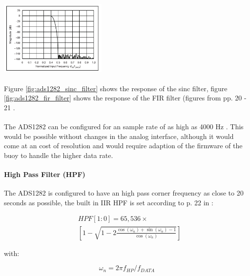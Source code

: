 \documentclass[a4paper]{article}
\begin{document}
\begin{multicols}{2}
\begin{center}
  \includegraphics[width=200px]{ads1282/fir_filter.png}
\end{center}
\label{fig:ads1282_fir_filter}

\paragraph{}
Figure \ref{fig:ads1282_sinc_filter} shows the response of the sinc
filter, figure \ref{fig:ads1282_fir_filter} shows the response of the
FIR filter (figures from  pp. 20 - 21
\cite{ads1282_ds}.

\paragraph{}The
ADS1282 can be configured for an sample rate of as high as 4000 Hz
\cite{ads1282_ds}. This would be possible without changes in the analog
interface, although it would come at an cost of resolution and would
require adaption of the firmware of the buoy to handle the higher data
rate.

\paragraph{High Pass Filter (HPF)} The ADS1282 is configured to have an high
pass corner frequency as close to 20 seconds as possible, the built in
IIR HPF is set according to p. 22 in :

\begin{equation}
  \begin{aligned}
    & HPF[1:0] = 65,536 \times \\
    & \left[ 1 - \sqrt{1 - 2 \frac{\cos (\omega_n) +
    \sin (\omega_n) - 1}{\cos
    (\omega_n)}}\right]
  \end{aligned}
  \label{eqn:hpf}
\end{equation}

with:

\begin{equation}
  \omega_n = 2 \pi f_{HP} / f_{DATA}
  \label{eqn:nat_freq}
\end{equation}


\end{multicols}
\end{document}

